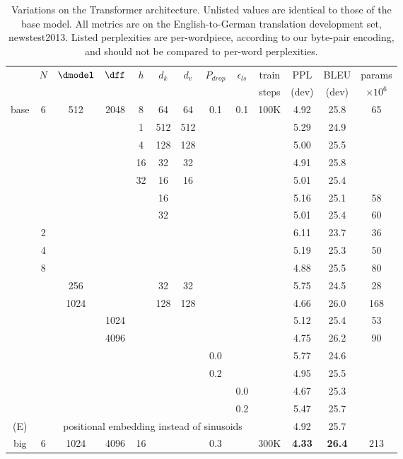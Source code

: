 \documentclass{article}
\begin{document}
\begin{table}[t]
\caption{Variations on the Transformer architecture. Unlisted values are identical to those of the base model.  All metrics are on the English-to-German translation development set, newstest2013.  Listed perplexities are per-wordpiece, according to our byte-pair encoding, and should not be compared to per-word perplexities.}
\label{tab:variations}
\begin{center}
\vspace{-2mm}
\begin{tabular}{c|ccccccccc|ccc}
\hline\rule{0pt}{2.0ex}
 & \multirow{2}{*}{$N$} & \multirow{2}{*}{$\dmodel$} &
\multirow{2}{*}{$\dff$} & \multirow{2}{*}{$h$} & 
\multirow{2}{*}{$d_k$} & \multirow{2}{*}{$d_v$} & 
\multirow{2}{*}{$P_{drop}$} & \multirow{2}{*}{$\epsilon_{ls}$} &
train & PPL & BLEU & params \\
 & & & & & & & & & steps & (dev) & (dev) & $\times10^6$ \\
\hline\rule{0pt}{2.0ex}
base & 6 & 512 & 2048 & 8 & 64 & 64 & 0.1 & 0.1 & 100K & 4.92 & 25.8 & 65 \\
\hline\rule{0pt}{2.0ex}
\multirow{4}{*}{(A)}
& & & & 1 & 512 & 512 & & & & 5.29 & 24.9 &  \\
& & & & 4 & 128 & 128 & & & & 5.00 & 25.5 &  \\
& & & & 16 & 32 & 32 & & & & 4.91 & 25.8 &  \\
& & & & 32 & 16 & 16 & & & & 5.01 & 25.4 &  \\
\hline\rule{0pt}{2.0ex}
\multirow{2}{*}{(B)}
& & & & & 16 & & & & & 5.16 & 25.1 & 58 \\
& & & & & 32 & & & & & 5.01 & 25.4 & 60 \\
\hline\rule{0pt}{2.0ex}
\multirow{7}{*}{(C)}
& 2 & & & & & & & &            & 6.11 & 23.7 & 36 \\
& 4 & & & & & & & &            & 5.19 & 25.3 & 50 \\
& 8 & & & & & & & &            & 4.88 & 25.5 & 80 \\
& & 256 & & & 32 & 32 & & &    & 5.75 & 24.5 & 28 \\
& & 1024 & & & 128 & 128 & & & & 4.66 & 26.0 & 168 \\
& & & 1024 & & & & & &         & 5.12 & 25.4 & 53 \\
& & & 4096 & & & & & &         & 4.75 & 26.2 & 90 \\
\hline\rule{0pt}{2.0ex}
\multirow{4}{*}{(D)}
& & & & & & & 0.0 & & & 5.77 & 24.6 &  \\
& & & & & & & 0.2 & & & 4.95 & 25.5 &  \\
& & & & & & & & 0.0 & & 4.67 & 25.3 &  \\
& & & & & & & & 0.2 & & 5.47 & 25.7 &  \\
\hline\rule{0pt}{2.0ex}
(E) & & \multicolumn{7}{c}{positional embedding instead of sinusoids} & & 4.92 & 25.7 & \\
\hline\rule{0pt}{2.0ex}
big & 6 & 1024 & 4096 & 16 & & & 0.3 & & 300K & \textbf{4.33} & \textbf{26.4} & 213 \\
\hline
\end{tabular}
\end{center}
\end{table}
\end{document}
